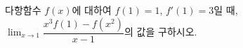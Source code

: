 다항함수 $f(x)$에 대하여 $f(1)=1$, $f'(1)=3$일 때, $\displaystyle\lim_{x\to 1}\dfrac{x^3f(1)-f(x^2)}{x-1}$의 값을 구하시오.
